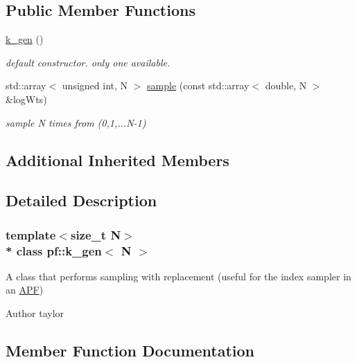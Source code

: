 \subsection*{Public Member Functions}
\begin{DoxyCompactItemize}
\item 
\hyperlink{classpf_1_1k__gen_a484ba2a5755d8fa66ed20dd9e153f8f2}{k\+\_\+gen} ()\hypertarget{classpf_1_1k__gen_a484ba2a5755d8fa66ed20dd9e153f8f2}{}\label{classpf_1_1k__gen_a484ba2a5755d8fa66ed20dd9e153f8f2}

\begin{DoxyCompactList}\small\item\em default constructor. only one available. \end{DoxyCompactList}\item 
std\+::array$<$ unsigned int, N $>$ \hyperlink{classpf_1_1k__gen_a8eb63d23aaf6b4bd3a4faa10add1b790}{sample} (const std\+::array$<$ double, N $>$ \&log\+Wts)
\begin{DoxyCompactList}\small\item\em sample N times from (0,1,...N-\/1) \end{DoxyCompactList}\end{DoxyCompactItemize}
\subsection*{Additional Inherited Members}


\subsection{Detailed Description}
\subsubsection*{template$<$size\+\_\+t N$>$\\*
class pf\+::k\+\_\+gen$<$ N $>$}

A class that performs sampling with replacement (useful for the index sampler in an \hyperlink{classpf_1_1APF}{A\+PF}) 

\begin{DoxyAuthor}{Author}
taylor 
\end{DoxyAuthor}


\subsection{Member Function Documentation}
